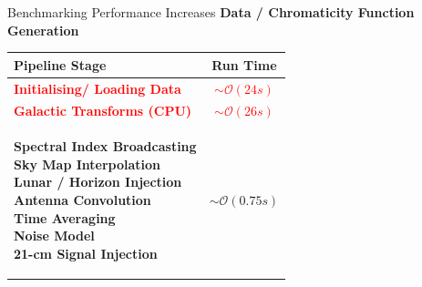 \documentclass{beamer}
\begin{document}
\begin{frame}{Benchmarking Performance Increases}
\textbf{Data / Chromaticity Function Generation}

\medskip
\footnotesize
\begin{table}[h]
\centering
\renewcommand{\arraystretch}{1.2}
\begin{tabular}{l c}
\hline
\textbf{Pipeline Stage} & \textbf{Run Time} \\
\hline
\textcolor{red}{\textbf{Initialising/ Loading Data}}              & \textcolor{red}{$\sim\mathcal{O}(24s)$} \\
\textcolor{red}{\textbf{Galactic Transforms (CPU)}}       & \textcolor{red}{$\sim\mathcal{O}(26s)$} \\

\multirow{}{}{\textcolor{green!40!black}{\parbox{0.45\textwidth}{
\textbf{Spectral Index Broadcasting}\\
\textbf{Sky Map Interpolation}\\
\textbf{Lunar / Horizon Injection}\\
\textbf{Antenna Convolution}\\
\textbf{Time Averaging}\\
\textbf{Noise Model}\\
\textbf{21-cm Signal Injection}
}}}
& \textcolor{green!40!black}{$\sim\mathcal{O}(0.75s)$} \\
\hline
\end{tabular}
\end{table}
\end{frame}
\end{document}
